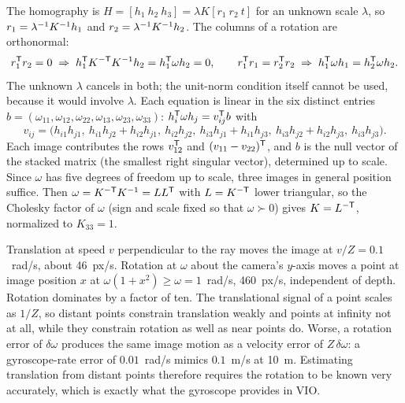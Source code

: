 \begin{solutions}
  \item The homography is $H = [h_1\ h_2\ h_3] = \lambda K[r_1\ r_2\ t]$ for an unknown scale $\lambda$, so $r_1 = \lambda^{-1} K^{-1} h_1$ and $r_2 = \lambda^{-1} K^{-1} h_2$. The columns of a
        rotation are orthonormal:
        \[
          r_1^{\mathsf{T}} r_2 = 0 \;\Rightarrow\; h_1^{\mathsf{T}} K^{-\mathsf{T}} K^{-1} h_2 = h_1^{\mathsf{T}}\omega h_2 = 0, \qquad
          r_1^{\mathsf{T}} r_1 = r_2^{\mathsf{T}} r_2 \;\Rightarrow\; h_1^{\mathsf{T}}\omega h_1 = h_2^{\mathsf{T}}\omega h_2 .
        \]
        The unknown $\lambda$ cancels in both; the unit-norm condition itself cannot be used, because it would involve $\lambda$. Each equation is linear in the six
        distinct entries $b = (\omega_{11}, \omega_{12}, \omega_{22}, \omega_{13}, \omega_{23}, \omega_{33})$: $h_i^{\mathsf{T}}\omega h_j = v_{ij}^{\mathsf{T}} b$ with
        \[
          v_{ij} = \big(h_{i1}h_{j1},\ h_{i1}h_{j2} + h_{i2}h_{j1},\ h_{i2}h_{j2},\ h_{i3}h_{j1} + h_{i1}h_{j3},\ h_{i3}h_{j2} + h_{i2}h_{j3},\ h_{i3}h_{j3}\big).
        \]
        Each image contributes the rows
        $v_{12}^{\mathsf{T}}$ and $(v_{11} - v_{22})^{\mathsf{T}}$, and $b$ is the null vector of the stacked matrix (the smallest right singular vector), determined up to scale. Since
        $\omega$ has five degrees of freedom up to scale, three images in general position suffice. Then $\omega = K^{-\mathsf{T}} K^{-1} = LL^{\mathsf{T}}$ with $L = K^{-\mathsf{T}}$ lower
        triangular, so the Cholesky factor of $\omega$ (sign and scale fixed so that $\omega \succ 0$) gives $K = L^{-\mathsf{T}}$, normalized to $K_{33} = 1$.

  \item Translation at speed $v$ perpendicular to the ray moves the image at $v/Z = 0.1$~rad/s, about 46~px/s. Rotation at $\omega$ about the camera's $y$-axis moves a point at image position $x$ at $\omega(1 + x^2) \ge \omega =
        1$~rad/s, 460~px/s, independent of depth. Rotation dominates by a factor of ten. The translational signal of a point scales as $1/Z$, so distant points
        constrain translation weakly and points at infinity not at all, while they constrain rotation as well as near points do. Worse, a rotation error of
        $\delta\omega$ produces the same image motion as a velocity error of $Z\,\delta\omega$: a gyroscope-rate error of $0.01$~rad/s mimics $0.1$~m/s at 10~m. Estimating
        translation from distant points therefore requires the rotation to be known very accurately, which is exactly what the gyroscope provides in VIO.
\end{solutions}
